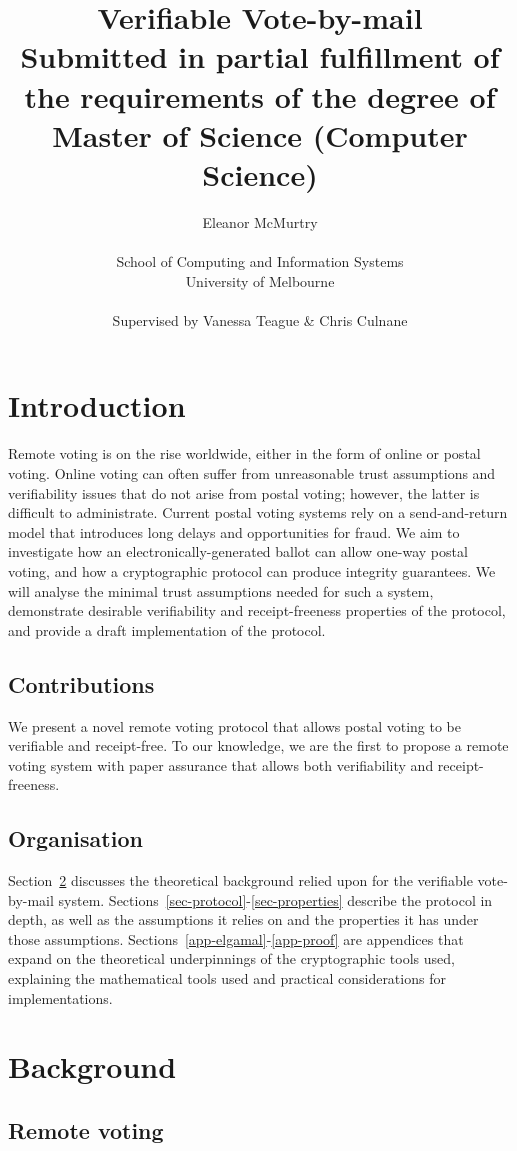 \documentclass[11pt,twoside,a4paper]{article}
\title{Verifiable Vote-by-mail\\\large Submitted in partial fulfillment of the requirements of the degree of Master of Science (Computer Science)}
\author{Eleanor McMurtry\\\\School of Computing and Information Systems\\University of Melbourne\\\\Supervised by Vanessa Teague \& Chris Culnane}
\theoremstyle{definition}
\begin{document}
\maketitle
\pagebreak
\tableofcontents
\vfill\pagebreak
\section{Introduction}
Remote voting is on the rise worldwide, either in the form of online or postal voting. Online voting can often suffer from unreasonable trust assumptions and verifiability issues that do not arise from postal voting; however, the latter is difficult to administrate. Current postal voting systems rely on a send-and-return model that introduces long delays and opportunities for fraud. We aim to investigate how an electronically-generated ballot can allow one-way postal voting, and how a cryptographic protocol can produce integrity guarantees. We will analyse the minimal trust assumptions needed for such a system, demonstrate desirable verifiability and receipt-freeness properties of the protocol, and provide a draft implementation of the protocol.
\subsection{Contributions}
We present a novel remote voting protocol that allows postal voting to be verifiable and receipt-free. To our knowledge, we are the first to propose a remote voting system with paper assurance that allows both verifiability and receipt-freeness.
\subsection{Organisation}
Section~\ref{sec-background} discusses the theoretical background relied upon for the verifiable vote-by-mail system. Sections~\ref{sec-protocol}-\ref{sec-properties} describe the protocol in depth, as well as the assumptions it relies on and the properties it has under those assumptions. Sections~\ref{app-elgamal}-\ref{app-proof}  are appendices that expand on the theoretical underpinnings of the cryptographic tools used, explaining the mathematical tools used and practical considerations for implementations.
\section{Background}\label{sec-background}
\subsection{Remote voting}
\end{document}
